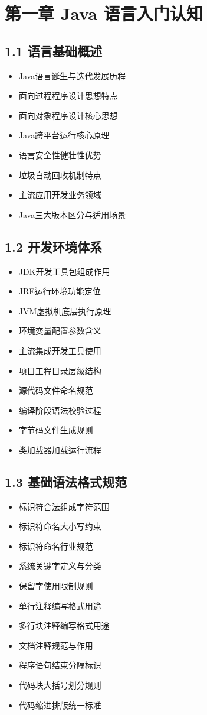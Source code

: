 \section{第一章 Java 语言入门认知}
\subsection{1.1 语言基础概述}
\begin{itemize}
\item Java语言诞生与迭代发展历程
\item 面向过程程序设计思想特点
\item 面向对象程序设计核心思想
\item Java跨平台运行核心原理
\item 语言安全性健壮性优势
\item 垃圾自动回收机制特点
\item 主流应用开发业务领域
\item Java三大版本区分与适用场景
\end{itemize}

\subsection{1.2 开发环境体系}
\begin{itemize}
\item JDK开发工具包组成作用
\item JRE运行环境功能定位
\item JVM虚拟机底层执行原理
\item 环境变量配置参数含义
\item 主流集成开发工具使用
\item 项目工程目录层级结构
\item 源代码文件命名规范
\item 编译阶段语法校验过程
\item 字节码文件生成规则
\item 类加载器加载运行流程
\end{itemize}

\subsection{1.3 基础语法格式规范}
\begin{itemize}
\item 标识符合法组成字符范围
\item 标识符命名大小写约束
\item 标识符命名行业规范
\item 系统关键字定义与分类
\item 保留字使用限制规则
\item 单行注释编写格式用途
\item 多行块注释编写格式用途
\item 文档注释规范与作用
\item 程序语句结束分隔标识
\item 代码块大括号划分规则
\item 代码缩进排版统一标准
\end{itemize}

